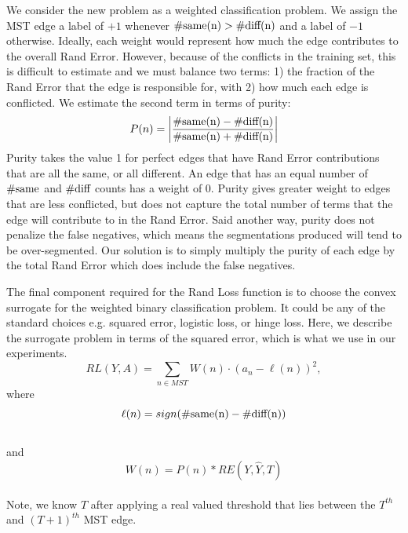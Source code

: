 \documentclass[letterpaper,twocolumn,fleqn]{article}
\begin{document}
We consider the new problem as a weighted classification problem. We assign the MST edge a label of $+1$ whenever $\#\hbox{same(n)} >\#\hbox{diff(n)}$ and a label of $-1$ otherwise. Ideally, each weight would represent how much the edge contributes to the overall Rand Error. However, because of the conflicts in the training set, this is difficult to estimate and we must balance two terms: 1) the fraction of the Rand Error that the edge is responsible for, with 2) how much each edge is conflicted. We estimate the second term in terms of purity:
\begin{equation}\label{eq:purity}
P(n) = \left\vert \frac{\#\hbox{same(n)}-\#\hbox{diff(n)}}{\#\hbox{same(n)}+\#\hbox{diff(n)}}\right\vert
\end{equation}
Purity takes the value 1 for perfect edges that have Rand Error contributions that are all the same, or all different. An edge that has an equal number of $\#\hbox{same}$ and $\#\hbox{diff}$ counts has a weight of $0$. Purity gives greater weight to edges that are less conflicted, but does not capture the total number of terms that the edge will contribute to in the Rand Error. Said another way, purity does not penalize the false negatives, which means the segmentations produced will tend to be over-segmented. Our solution is to simply multiply the purity of each edge by the total Rand Error which does include the false negatives. 

The final component required for the Rand Loss function is to choose the convex surrogate for the weighted binary classification problem. It could be any of the standard choices e.g. squared error, logistic loss, or hinge loss. Here, we describe the surrogate problem in terms of the squared error, which is what we use in our experiments. 
\begin{equation}
    \label{eq:weighted_classification}
    RL(Y, A) = \sum_{n\in MST}{W(n) \cdot \left(a_n-\ell(n)\right)^2},
\end{equation}
where
\begin{equation}\label{eq:label}
\ell(n) = sign(\#\hbox{same(n)} -\#\hbox{diff(n)})
\end{equation}\\
and
\begin{equation}\label{eq:weight}
W(n) = P(n)*RE(Y,\widehat{Y},T)
\end{equation}\\
Note, we know $T$ after applying a real valued threshold that lies between the $T^{th}$ and $(T+1)^{th}$ MST edge. 
\end{document}
